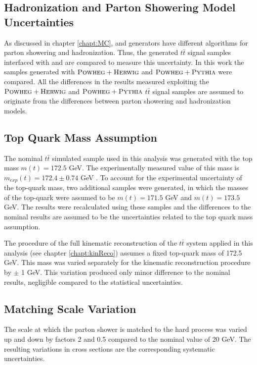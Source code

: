 \subsection{Hadronization and Parton Showering Model Uncertainties}

As discussed in chapter \ref{chapt:MC}, \PYTHIA and \HERWIG generators have different algorithms for parton showering and hadronization.
Thus, the generated $t\bar{t}$ signal samples interfaced with \PYTHIA and \HERWIG are compared to measure this uncertainty. In this work
the samples generated with $\textsc{Powheg}+\textsc{Herwig}$ and $\textsc{Powheg}+\textsc{Pythia}$ were compared. All the differences in the results measured exploiting the
$\textsc{Powheg}+\textsc{Herwig}$ and $\textsc{Powheg}+\textsc{Pythia}$ $t\bar{t}$ signal samples are assumed to originate from the differences between parton showering
and hadronization models.

\subsection{Top Quark Mass Assumption}

The nominal $t\bar{t}$ simulated sample used in this analysis was generated with the top mass $m(t) = 172.5$ GeV. The experimentally measured
value of this mass is $m_{exp}(t) = 172.4 \pm 0.74$ GeV \cite{ATLAS:2014wva}. To account for the experimental uncertainty of the top-quark
mass, two additional samples were generated, in which the masses of the top-quark were assumed to be $m(t) = 171.5$ GeV and
$m(t) = 173.5$ GeV. The results were recalculated using these samples and the differences to the nominal results are assumed to
be the uncertainties related to the top quark mass assumption.

The procedure of the full kinematic reconstruction of the $t\bar{t}$ system applied in this analysis (see chapter \ref{chapt:kinReco})
assumes a fixed top-quark mass of 172.5 GeV. This mass was varied separately for the kinematic reconstruction procedure by $\pm$ 1 GeV. 
This variation produced only minor difference to the nominal results, negligible compared to the statistical uncertainties.

\subsection{Matching Scale Variation}

The scale at which the parton shower is matched to the hard process was varied up and down by factors 2 and 0.5 compared to the nominal
value of 20 GeV. The resulting variations in cross sections are the corresponding systematic uncertainties.

